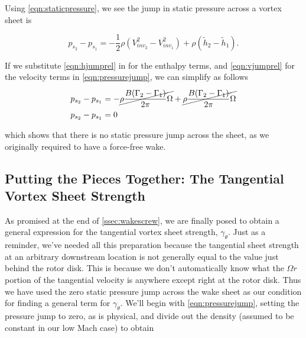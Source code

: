 Using \cref{eqn:staticpressure}, we see the jump in static pressure across a vortex sheet is

\begin{equation}
    \label{eqn:pressurejump}
    p_{s_2} - p_{s_1} = -\frac{1}{2} \rho \left(V_{{inv}_2}^2 - V_{{inv}_1}^2 \right) + \rho \left( \widetilde{h}_2 - \widetilde{h}_1 \right).
\end{equation}


\noindent If we substitute \cref{eqn:hjumprel} in for the enthalpy terms, and \cref{eqn:vjumprel} for the velocity terms in \cref{eqn:pressurejump}, we can simplify as follows

\begin{align}
    p_{s_2} - p_{s_1} &= -\cancel{\rho \frac{B(\Gamma_2-\Gamma_1)}{2 \pi} \Omega} + \cancel{\rho \frac{B(\Gamma_2-\Gamma_1)}{2 \pi} \Omega} \\
    p_{s_2} - p_{s_1} &= 0
\end{align}

\noindent which shows that there is no static pressure jump across the sheet, as we originally required to have a force-free wake. %





\subsection{Putting the Pieces Together: The Tangential Vortex Sheet Strength}
\label{ssec:vortexsheetstrength}

As promised at the end of \cref{ssec:wakescrew}, we are finally posed to obtain a general expression for the tangential vortex sheet strength, \(\gamma_\theta\).
%
Just as a reminder, we've needed all this preparation because the tangential sheet strength at an arbitrary downstream location is not generally equal to the value just behind the rotor disk.
%
This is because we don't automatically know what the \(\Omega r\) portion of the tangential velocity is anywhere except right at the rotor disk.
%
Thus we have used the zero static pressure jump across the wake sheet as our condition for finding a general term for \(\gamma_\theta\).
%
We'll begin with \cref{eqn:pressurejump}, setting the pressure jump to zero, as is physical, and divide out the density (assumed to be constant in our low Mach case) to obtain

